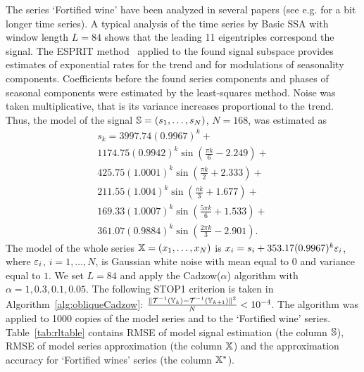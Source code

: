 \documentclass[sii]{ipart}
\begin{document}
The series `Fortified wine' have been analyzed in several papers (see e.g. \cite{Golyandina.etal2015} for a bit longer time series).
A typical analysis of the time series by Basic SSA with window length $L=84$ shows that the leading 11 eigentriples
correspond the signal. The ESPRIT method~\cite{Roy.Kailath1989,Golyandina.Zhigljavsky2012} applied to the found signal subspace provides
estimates of exponential rates for the trend and for modulations of seasonality components.
Coefficients before the found series components and phases of seasonal components were estimated by
the least-squares method. Noise was taken multiplicative, that is its variance increases proportional to the trend.
Thus, the model of the signal $\mathbb{S} = (s_{1}, \ldots, s_N)$, $N=168$, was estimated as
%
%
\begin{multline*}
s_{k} = 3997.74 (0.9967)^k + \\
1174.75 (0.9942)^k \sin(\frac{\pi k}{6} - 2.249) + \\
425.75 (1.0001)^k \sin(\frac{\pi k}{2} + 2.333) + \\
211.55 (1.004)^k \sin(\frac{\pi k}{3} + 1.677) + \\
169.33 (1.0007)^k \sin(\frac{5 \pi k}{6} + 1.533) + \\
361.07 (0.9884)^k \sin(\frac{2 \pi k}{3} - 2.901).
\end{multline*}
The model of the whole series $\mathbb{X}=(x_1,\ldots,x_N)$ is $x_i=s_i + 353.17 (0.9967)^k \varepsilon_i$,
where  $\varepsilon_i$, $i=1,\ldots,N$,  is Gaussian white noise with mean equal to $0$ and variance equal to $1$.
We set $L=84$ and apply the Cadzow($\alpha$) algorithm with $\alpha=1, 0.3, 0.1, 0.05$.
The following STOP1 criterion is taken in Algorithm~\ref{alg:obliqueCadzow}:
$\frac{\|\mathcal{T}^{-1}(\mathbb{Y}_k) - \mathcal{T}^{-1}(\mathbb{Y}_{k + 1})\|^2}{N} < 10^{-4}$.
The algorithm was applied to 1000 copies of the model series and to the `Fortified wine' series.
Table~\ref{tab:rltable} contains RMSE of model signal estimation (the column $\mathbb{S}$),
RMSE of model series approximation (the column $\mathbb{X}$) and the approximation accuracy for
`Fortified wines' series (the column $\mathbb{X}^*$).
\end{document}
